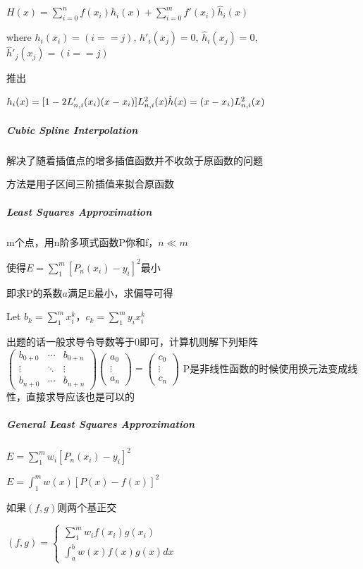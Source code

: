\documentclass[]{article}
\let\oldsubparagraph\subparagraph
\renewcommand{\subparagraph}[1]{\oldsubparagraph{#1}\mbox{}}
\begin{document}
\begin{multicols}{3}
\( H(x) = \sum_{i=0}^n f(x_i)h_i(x) + \sum_{i=0}^{m}f'(x_i)\hat h_i(x)\)

where \(h_i(x_i) = (i == j)\), \(h'_i(x_j) = 0\), \(\hat h_i(x_j) = 0\),
\(\hat h'_j(x_j) = (i == j) \)

推出

\(h_i(x)=[1-2L'_{n,i}(x_i)(x-x_i)]L^2_{n,i}(x)\\
\hat h(x)=(x-x_i)L_{n,i}^2(x)\)

\subparagraph{Cubic Spline Interpolation}\label{header-c402}

解决了随着插值点的增多插值函数并不收敛于原函数的问题

方法是用子区间三阶插值来拟合原函数


\subparagraph{Least Squares Approximation}\label{header-c408}

m个点，用n阶多项式函数P你和f，\(n \ll m\)

使得\(E = \sum_1^m[P_n(x_i) - y_i]^2\)最小

即求P的系数\(a\)满足E最小，求偏导可得

Let \( b_k = \sum_1^mx_i^k\)，\( c_k=\sum_1^m{y_ix_i^k}\)

出题的话一般求导令导数等于0即可，计算机则解下列矩阵
$
\begin{pmatrix}
b_{0+0}  & \cdots & b_{0+n} \\
\vdots & \ddots & \vdots \\
b_{n+0} & \cdots & b_{n+n} 
\end{pmatrix}
\begin{pmatrix}
a_0\\ \vdots \\ a_n
\end{pmatrix}
=
\begin{pmatrix}
c_0\\ \vdots \\ c_n
\end{pmatrix}
$
P是非线性函数的时候使用换元法变成线性，直接求导应该也是可以的

\subparagraph{General Least Squares Approximation}\label{header-c422}

\(E = \sum _1^mw_i[P_n(x_i) - y_i]^2\)

\(E = \int _1^mw(x)[P(x) - f(x)]^2\)

如果\((f, g)\)则两个基正交

\((f,g) =\begin{cases} 
\sum_1^m w_i f(x_i)g(x_i) \\
\int_a^bw(x)f(x)g(x)dx
\end{cases}\)


\end{multicols}
\end{document}
